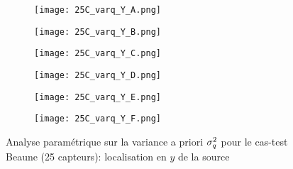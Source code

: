     \begin{figure}[p!]
    	\centering
    	\begin{subfigure}[t]{0.5\textwidth}
    		\centering
    		\texttt{[image: 25C\_varq\_Y\_A.png]}
    		\caption{}
    		\label{varq_A_y}
    	\end{subfigure}%
    	\begin{subfigure}[t]{0.5\textwidth}
    		\centering
    		\texttt{[image: 25C\_varq\_Y\_B.png]}
    		\caption{}
    		\label{varq_B_y}
    	\end{subfigure}
    	\begin{subfigure}[t]{0.5\textwidth}
    		\centering
    		\texttt{[image: 25C\_varq\_Y\_C.png]}
    		\caption{}
    		\label{varq_C_y}
    	\end{subfigure}%
    	\begin{subfigure}[t]{0.5\textwidth}
    		\centering
    		\texttt{[image: 25C\_varq\_Y\_D.png]}
    		\caption{}
    		\label{varq_D_y}
    	\end{subfigure}
    	\begin{subfigure}[t]{0.5\textwidth}
    		\centering
    		\texttt{[image: 25C\_varq\_Y\_E.png]}
    		\caption{}
    		\label{varq_E_y}
    	\end{subfigure}%
    	\begin{subfigure}[t]{0.5\textwidth}
    		\centering
    		\texttt{[image: 25C\_varq\_Y\_F.png]}
    		\caption{}
    		\label{varq_F_y}
    	\end{subfigure}
    	\caption{Analyse paramétrique sur la variance a priori $\sigma_q^2$ pour le cas-test Beaune (25 capteurs): localisation en $y$ de la source}
    	\label{fig_25C_analyse_varq_y}
    \end{figure}
    
